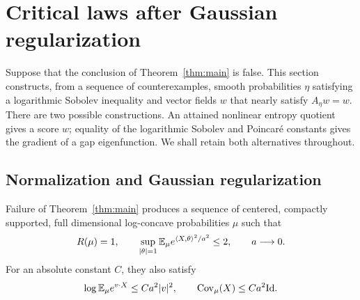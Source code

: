 \section{Critical laws after Gaussian regularization}\label{sec:critical}

Suppose that the conclusion of Theorem~\ref{thm:main} is false.
This section constructs, from a sequence of counterexamples, smooth
probabilities $\eta$ satisfying a logarithmic Sobolev inequality and
vector fields $w$ that nearly satisfy $A_\eta w=w$. There are two
possible constructions. An attained nonlinear entropy quotient gives
a score $w$; equality of the logarithmic Sobolev and Poincar\'e
constants gives the gradient of a gap eigenfunction. We shall retain
both alternatives throughout.

\subsection{Normalization and Gaussian regularization}

\begin{lemma}\label{lem:critical-normalization}
Failure of Theorem~\ref{thm:main} produces a sequence of centered,
compactly supported, full dimensional log-concave probabilities $\mu$
such that
\begin{equation}\label{eq:critical-normalization}
 R(\mu)=1,\qquad
 \sup_{|\theta|=1}\mathbb E_\mu e^{\langle X,\theta\rangle^2/a^2}
 \le2,\qquad a\longrightarrow0.
\end{equation}
For an absolute constant $C$, they also satisfy
\begin{equation}\label{eq:critical-linear-mgf}
 \log\mathbb E_\mu e^{v\cdot X}\le Ca^2|v|^2,
 \qquad \operatorname{Cov}_\mu(X)\le Ca^2\mathrm{Id}.
\end{equation}
\end{lemma}

